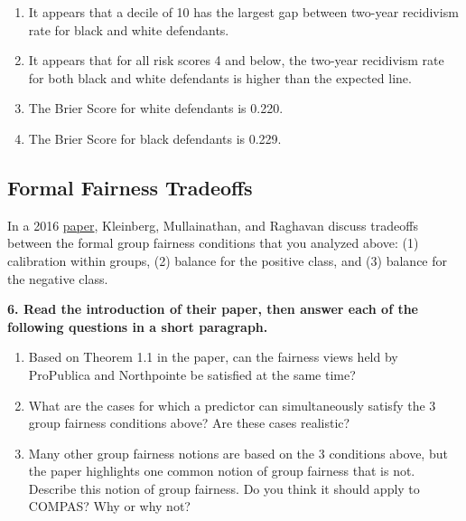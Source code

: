 \documentclass{article}
\begin{document}
\bigskip
\begin{mdframed}
\begin{enumerate}[label=\Alph*.]
\item It appears that a decile of 10 has the largest gap between two-year recidivism rate for black and white defendants.
\item It appears that for all risk scores 4 and below, the two-year recidivism rate for both black and white defendants is higher than the expected line.  
\item The Brier Score for white defendants is 0.220.
\item The Brier Score for black defendants is 0.229.
\end{enumerate}
\end{mdframed}
\bigskip

\subsection*{Formal Fairness Tradeoffs}

In a 2016 \href{https://arxiv.org/pdf/1609.05807}{paper},
Kleinberg, Mullainathan, and Raghavan discuss 
tradeoffs between the formal group fairness conditions that you analyzed above: (1) calibration within groups, (2) balance for the positive class, and (3) balance for the negative class. 

\textbf{6. Read the introduction of their paper, then answer each of the following questions in a short paragraph.}
\begin{enumerate}[label=\Alph*.]
\item Based on Theorem 1.1 in the paper, can the fairness views held by ProPublica and Northpointe be satisfied at the same time?
\item What are the cases for which a predictor can simultaneously satisfy the 3 group fairness conditions above? Are these cases realistic? 
\item Many other group fairness notions are based on the 3 conditions above, but the paper highlights one common notion of group fairness that is not. Describe this notion of group fairness. Do you think it should apply to COMPAS? Why or why not?
\end{enumerate}
\end{document}
